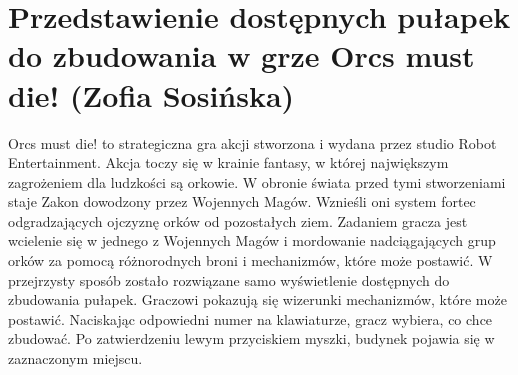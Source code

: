 \section{Przedstawienie dostępnych pułapek do zbudowania w grze Orcs must die! (Zofia Sosińska)}\label{chap:omd}

Orcs must die! to strategiczna gra akcji stworzona i wydana przez studio Robot Entertainment. Akcja toczy się w krainie fantasy, w której największym zagrożeniem dla ludzkości są orkowie. W obronie świata przed tymi stworzeniami staje Zakon dowodzony przez Wojennych Magów. Wznieśli oni system fortec odgradzających ojczyznę orków od pozostałych ziem. Zadaniem gracza jest wcielenie się w jednego z  Wojennych Magów i mordowanie nadciągających grup orków za pomocą różnorodnych broni i mechanizmów, które może postawić.
W przejrzysty sposób zostało rozwiązane samo wyświetlenie dostępnych do zbudowania pułapek. Graczowi pokazują się wizerunki mechanizmów, które może postawić. Naciskając odpowiedni numer na klawiaturze, gracz wybiera, co chce zbudować. Po zatwierdzeniu lewym przyciskiem myszki, budynek pojawia się w zaznaczonym miejscu.
